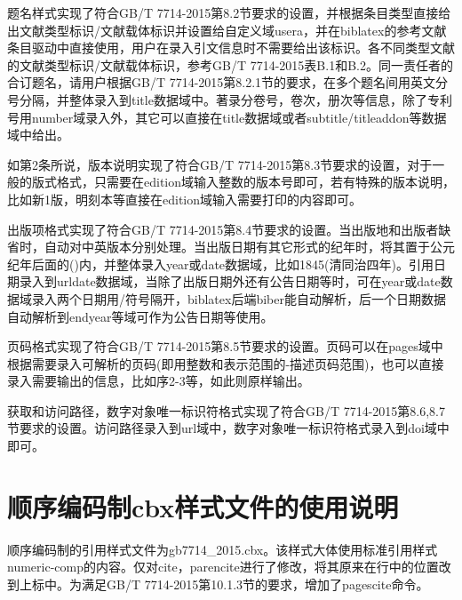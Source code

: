 \documentclass[11pt]{article} %
\begin{document}
\begin{property}{}{}
题名样式实现了符合GB/T 7714-2015第8.2节要求的设置，并根据条目类型直接给出文献类型标识/文献载体标识并设置给自定义域usera，并在biblatex的参考文献条目驱动中直接使用，用户在录入引文信息时不需要给出该标识。各不同类型文献的文献类型标识/文献载体标识，参考GB/T 7714-2015表B.1和B.2。同一责任者的合订题名，请用户根据GB/T 7714-2015第8.2.1节的要求，在多个题名间用英文分号分隔，并整体录入到title数据域中。著录分卷号，卷次，册次等信息，除了专利号用number域录入外，其它可以直接在title数据域或者subtitle/titleaddon等数据域中给出。
\end{property}

\begin{property}{}{}
如第2条所说，版本说明实现了符合GB/T 7714-2015第8.3节要求的设置，对于一般的版式格式，只需要在edition域输入整数的版本号即可，若有特殊的版本说明，比如新1版，明刻本等直接在edition域输入需要打印的内容即可。
\end{property}

\begin{property}{}{}
出版项格式实现了符合GB/T 7714-2015第8.4节要求的设置。当出版地和出版者缺省时，自动对中英版本分别处理。当出版日期有其它形式的纪年时，将其置于公元纪年后面的()内，并整体录入year或date数据域，比如1845(清同治四年)。引用日期录入到urldate数据域，当除了出版日期外还有公告日期等时，可在year或date数据域录入两个日期用/符号隔开，biblatex后端biber能自动解析，后一个日期数据自动解析到endyear等域可作为公告日期等使用。
\end{property}


\begin{property}{}{}
页码格式实现了符合GB/T 7714-2015第8.5节要求的设置。页码可以在pages域中根据需要录入可解析的页码(即用整数和表示范围的-描述页码范围)，也可以直接录入需要输出的信息，比如序2-3等，如此则原样输出。
\end{property}


\begin{property}{}{}
获取和访问路径，数字对象唯一标识符格式实现了符合GB/T 7714-2015第8.6,8.7节要求的设置。访问路径录入到url域中，数字对象唯一标识符格式录入到doi域中即可。
\end{property}

\section{顺序编码制cbx样式文件的使用说明}

顺序编码制的引用样式文件为gb7714\_2015.cbx。该样式大体使用标准引用样式numeric-comp的内容。仅对cite，parencite进行了修改，将其原来在行中的位置改到上标中。为满足GB/T 7714-2015第10.1.3节的要求，增加了pagescite命令。
\end{document}

